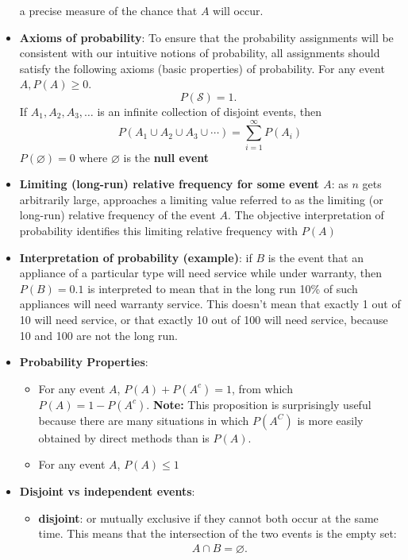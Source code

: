 \documentclass{report}
\begin{document}
\begin{itemize}
a precise measure of the chance that $A$ will occur. 
        \item \textbf{Axioms of probability}: To ensure that the probability assignments will be consistent with our intuitive notions of probability, all assignments should satisfy the following axioms (basic properties) of probability.
            For any event $A, P(A) \geq 0$.
            $$
            P(\mathcal{S})=1 \text {. }
            $$
            If $A_1, A_2, A_3, \ldots$ is an infinite collection of disjoint events, then
            $$
            P\left(A_1 \cup A_2 \cup A_3 \cup \cdots\right)=\sum_{i=1}^{\infty} P\left(A_i\right)
            $$
            \bigbreak \noindent 
            $P(\varnothing) =0 $ where $\varnothing$ is the \textbf{null event}
        \item \textbf{Limiting (long-run) relative frequency for some event $A$}: as $n$ gets arbitrarily large, approaches a limiting value referred to as the limiting (or long-run) relative frequency of the event $A$. The objective interpretation of probability identifies this limiting relative frequency with $P(A)$
        \item \textbf{Interpretation of probability (example)}: if $B$ is the event that an appliance of a particular type will need service
            while under warranty, then $P(B) = 0.1$ is interpreted to mean that in the long run 10\%
            of such appliances will need warranty service. This doesn’t mean that exactly 1 out
            of 10 will need service, or that exactly 10 out of 100 will need service, because 10
            and 100 are not the long run.
        \item \textbf{Probability Properties}:
            \begin{itemize}
                \item For any event \( A \), \( P(A) + P(A^c) = 1 \), from which \( P(A) = 1 - P(A^c) \).
                    \bigbreak \noindent 
                    \textbf{Note:} This proposition is surprisingly useful because there are many situations in which $P(A^{C})$ is more easily obtained by direct methods than is $P(A)$.
                \item For any event $A$, $P(A) \leq 1 $
            \end{itemize}
        \item \textbf{Disjoint vs independent events}:
            \begin{itemize}
                \item \textbf{disjoint}: or mutually exclusive if they cannot both occur at the same time. This means that the intersection of the two events is the empty set:
                    \begin{align*}
                        A \cap B = \varnothing
                    .\end{align*}


\end{itemize}
\end{itemize}
\end{document}
